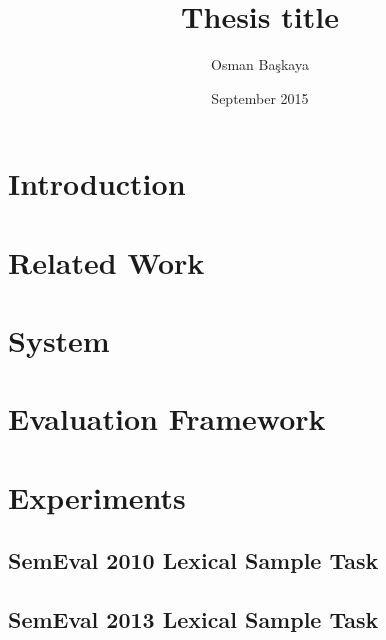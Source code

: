 \documentclass[a4paper, 12pt]{book}
\title{Thesis title}
\author{Osman Başkaya}
\date{September 2015}
\begin{document}
\maketitle




\tableofcontents
 
\listoftables

\listoffigures

 

\chapter{Introduction}


%


\chapter{Related Work}
\label{chapter:related-work}


\chapter{System}
\label{chapter:system}



\chapter{Evaluation Framework}
\label{chapter:evaluation-framework}


\chapter{Experiments}
\label{chapter:experiments}
\section{SemEval 2010 Lexical Sample Task}
\label{subsection:semeval10}


\section{SemEval 2013 Lexical Sample Task}
\label{subsection:semeval13}

\end{document}
